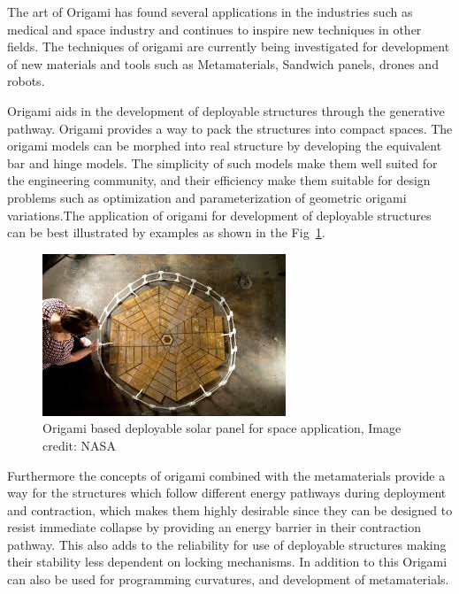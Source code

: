 The art of Origami has found several applications in the industries such as medical and space industry and continues to inspire new techniques in other fields. The techniques of origami are currently being investigated for development of new materials and tools such as Metamaterials, Sandwich panels, drones and robots.

Origami aids in the development of deployable structures through the generative pathway\cite{rivas2015deployable}. Origami provides a way to pack the structures into compact spaces. The origami models can be morphed into real structure by developing the equivalent bar and hinge models\cite{FilipBarandHinge}. The simplicity of such models make them well suited for the engineering community, and their efficiency make them suitable for design problems such as optimization and parameterization of geometric origami variations.The application of origami for development of deployable structures can be best illustrated by examples as shown in the Fig~\ref{fig:OrigamiEx}.
\begin{figure}[htbp]
    \centering
    \includegraphics[width = 0.8\linewidth]{Figures/Origami_NASA.jpg}
    \caption{Origami based deployable solar panel for space application, Image credit: NASA}
    \label{fig:OrigamiEx}
\end{figure}


Furthermore the concepts of origami combined with the metamaterials provide a way for the structures which follow different energy pathways during deployment and contraction, which makes them highly desirable since they can be designed to resist immediate collapse by providing an energy barrier in their contraction pathway\cite{Zha}. This also adds to the reliability for use of deployable structures making their stability less dependent on locking mechanisms. In addition to this Origami can also be used for programming curvatures\cite{Dud}, and development of metamaterials\cite{Filip}.

